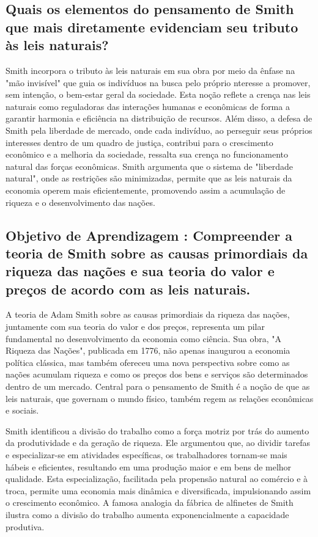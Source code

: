 \documentclass[a4paper,12pt]{article}[abntex2]
\begin{document}
\subsection{\textbf{Quais os elementos do pensamento de Smith que mais diretamente evidenciam seu tributo às leis naturais?}}
Smith incorpora o tributo às leis naturais em sua obra por meio da ênfase na "mão invisível" que guia os indivíduos na busca pelo próprio nteresse a promover, sem intenção, o bem-estar geral da sociedade. Esta noção reflete a crença nas leis naturais como reguladoras das interações humanas e econômicas de forma a garantir harmonia e eficiência na distribuição de recursos. Além disso, a defesa de Smith pela liberdade de mercado, onde cada indivíduo, ao perseguir seus próprios interesses dentro de um quadro de justiça, contribui para o crescimento econômico e a melhoria da sociedade, ressalta sua crença no funcionamento natural das forças econômicas. Smith argumenta que o sistema de "liberdade natural", onde as restrições são minimizadas, permite que as leis naturais da economia operem mais eficientemente, promovendo assim a acumulação de riqueza e o desenvolvimento das nações.
\subsection{\textbf{Objetivo de Aprendizagem : Compreender a teoria de Smith sobre as causas primordiais da riqueza das nações e sua teoria do valor e preços de acordo com as leis naturais.}}
A teoria de Adam Smith sobre as causas primordiais da riqueza das nações, juntamente com sua teoria do valor e dos preços, representa um pilar fundamental no desenvolvimento da economia como ciência. Sua obra, "A Riqueza das Nações", publicada em 1776, não apenas inaugurou a economia política clássica, mas também ofereceu uma nova perspectiva sobre como as nações acumulam riqueza e como os preços dos bens e serviços são determinados dentro de um mercado. Central para o pensamento de Smith é a noção de que as leis naturais, que governam o mundo físico, também regem as relações econômicas e sociais.

Smith identificou a divisão do trabalho como a força motriz por trás do aumento da produtividade e da geração de riqueza. Ele argumentou que, ao dividir tarefas e especializar-se em atividades específicas, os trabalhadores tornam-se mais hábeis e eficientes, resultando em uma produção maior e em bens de melhor qualidade. Esta especialização, facilitada pela propensão natural ao comércio e à troca, permite uma economia mais dinâmica e diversificada, impulsionando assim o crescimento econômico. A famosa analogia da fábrica de alfinetes de Smith ilustra como a divisão do trabalho aumenta exponencialmente a capacidade produtiva.
\end{document}
